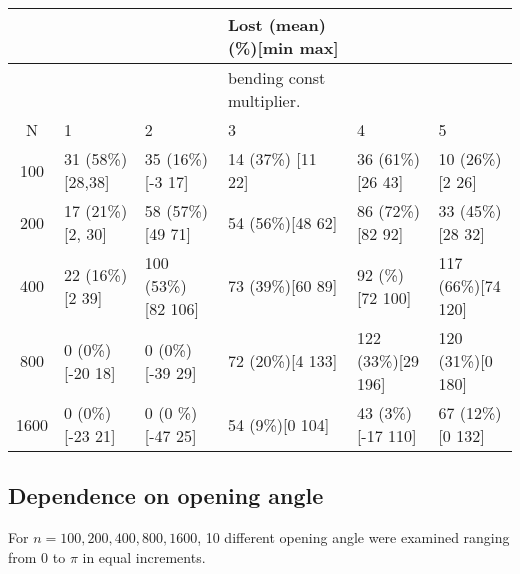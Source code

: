 \documentclass[12pt]{report}
\begin{document}
\begin{table}[H]
	\tiny{
 \begin{tabular}{c| l l l l l}
 	   &           & & Lost (mean) (\%)[min max]& &  \\
 	 \hline
 	   &           & & bending const multiplier. & &  \\
 	   \hline 
     N 	   &            1 & 2 & 3 & 4& 5 \\   	 
 	 \hline 
 	 100 & 31 (58\%) [28,38] & 35 (16\%)[-3 17]    & 14 (37\%) [11 22] & 36 (61\%)[26 43]   & 10 (26\%)[2 26]\\
 	 200 & 17 (21\%) [2, 30] & 58 (57\%)[49 71]    & 54 (56\%)[48 62]  & 86 (72\%) [82 92]  & 33 (45\%)[28 32]\\
 	 400 & 22 (16\%) [2 39]  & 100 (53\%) [82 106] & 73 (39\%)[60 89]  & 92 (\%)[72 100]    & 117 (66\%)[74 120] \\
 	 800 &  0 (0\%) [-20 18] & 0 (0\%) [-39 29]    & 72 (20\%)[4 133]  & 122 (33\%)[29 196] & 120 (31\%)[0 180]\\
 	 1600&  0 (0\%)[-23 21]  & 0 (0 \%) [-47 25]   & 54 (9\%)[0 104]   & 43 (3\%)[-17 110]  & 67 (12\%)[0 132]\\
 \end{tabular}
}
\end{table}

\subsection{Dependence on opening angle}
For $n=100,200,400,800,1600$, 10 different opening angle were examined ranging from $0$ to $\pi$ in equal increments. 
\end{document}
